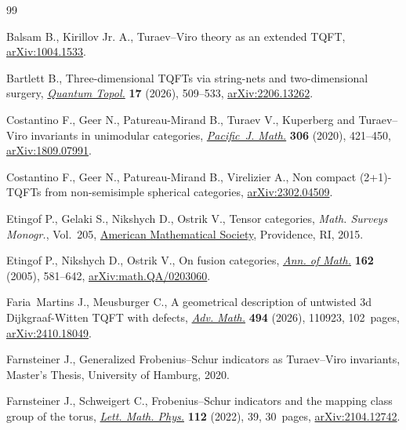 \documentclass[pdftex]{sigma}
\numberwithin{equation}{section}
\theoremstyle{definition}
\begin{document}
\begin{thebibliography}{99}
\footnotesize\itemsep=0pt

Balsam B., Kirillov Jr. A., Turaev--{V}iro theory as an extended {TQFT},
 \href{http://arxiv.org/abs/1004.1533}{arXiv:1004.1533}.

Bartlett B., Three-dimensional {TQFT}s via string-nets and two-dimensional
 surgery, \href{https://doi.org/10.4171/qt/260}{\textit{Quantum Topol.}}
 \textbf{17} (2026), 509--533,
 \href{http://arxiv.org/abs/2206.13262}{arXiv:2206.13262}.

Costantino F., Geer N., Patureau-Mirand B., Turaev V., Kuperberg and
 {T}uraev--{V}iro invariants in unimodular categories,
 \href{https://doi.org/10.2140/pjm.2020.306.421}{\textit{Pacific~J. Math.}}
 \textbf{306} (2020), 421--450,
 \href{http://arxiv.org/abs/1809.07991}{arXiv:1809.07991}.

Costantino F., Geer N., Patureau-Mirand B., Virelizier A., Non compact
 (2+1)-{TQFT}s from non-semisimple spherical categories,
 \href{http://arxiv.org/abs/2302.04509}{arXiv:2302.04509}.

Etingof P., Gelaki S., Nikshych D., Ostrik V., Tensor categories, \textit{Math.
 Surveys Monogr.}, Vol.~205, \href{https://doi.org/10.1090/surv/205}{American
 Mathematical Society}, Providence, RI, 2015.

Etingof P., Nikshych D., Ostrik V., On fusion categories,
 \href{https://doi.org/10.4007/annals.2005.162.581}{\textit{Ann. of Math.}}
 \textbf{162} (2005), 581--642,
 \href{http://arxiv.org/abs/math.QA/0203060}{arXiv:math.QA/0203060}.

Faria~Martins J., Meusburger C., A geometrical description of untwisted 3d
 {D}ijkgraaf-{W}itten {TQFT} with defects,
 \href{https://doi.org/10.1016/j.aim.2026.110923}{\textit{Adv. Math.}}
 \textbf{494} (2026), 110923, 102~pages,
 \href{http://arxiv.org/abs/2410.18049}{arXiv:2410.18049}.

Farnsteiner J., Generalized {F}robenius--{S}chur indicators as {T}uraev--{V}iro
 invariants, {M}aster's {T}hesis, University of Hamburg, 2020.

Farnsteiner J., Schweigert C., Frobenius--{S}chur indicators and the mapping
 class group of the torus,
 \href{https://doi.org/10.1007/s11005-022-01513-6}{\textit{Lett. Math. Phys.}}
 \textbf{112} (2022), 39, 30~pages,
 \href{http://arxiv.org/abs/2104.12742}{arXiv:2104.12742}.


\end{thebibliography}
\end{document}
